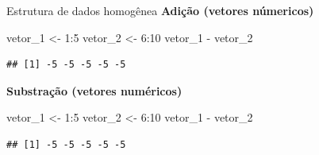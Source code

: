 \documentclass[
  10pt,
  ignorenonframetext,
]{beamer}
\newenvironment{Shaded}{}{}
\newcommand{\DecValTok}[1]{#1}
\newcommand{\NormalTok}[1]{#1}
\newcommand{\OperatorTok}[1]{#1}
\newcommand{\StringTok}[1]{\textcolor[rgb]{0.00,0.50,0.50}{#1}}
\begin{document}
\begin{frame}[fragile]{Estrutura de dados homogênea}
\protect\hypertarget{estrutura-de-dados-homoguxeanea-8}{}
\textbf{Adição (vetores númericos)}

\begin{Shaded}
\begin{Highlighting}[]
\NormalTok{vetor\_}\DecValTok{1}\NormalTok{ \textless{}{-}}\StringTok{ }\DecValTok{1}\OperatorTok{:}\DecValTok{5}
\NormalTok{vetor\_}\DecValTok{2}\NormalTok{ \textless{}{-}}\StringTok{ }\DecValTok{6}\OperatorTok{:}\DecValTok{10}
\NormalTok{vetor\_}\DecValTok{1} \OperatorTok{{-}}\StringTok{ }\NormalTok{vetor\_}\DecValTok{2}
\end{Highlighting}
\end{Shaded}

\begin{verbatim}
## [1] -5 -5 -5 -5 -5
\end{verbatim}

\textbf{Substração (vetores numéricos)}

\begin{Shaded}
\begin{Highlighting}[]
\NormalTok{vetor\_}\DecValTok{1}\NormalTok{ \textless{}{-}}\StringTok{ }\DecValTok{1}\OperatorTok{:}\DecValTok{5}
\NormalTok{vetor\_}\DecValTok{2}\NormalTok{ \textless{}{-}}\StringTok{ }\DecValTok{6}\OperatorTok{:}\DecValTok{10}
\NormalTok{vetor\_}\DecValTok{1} \OperatorTok{{-}}\StringTok{ }\NormalTok{vetor\_}\DecValTok{2}
\end{Highlighting}
\end{Shaded}

\begin{verbatim}
## [1] -5 -5 -5 -5 -5
\end{verbatim}
\end{frame}
\end{document}
